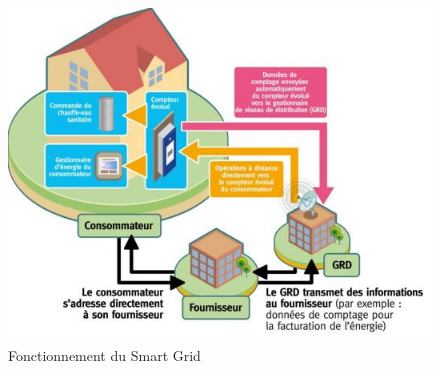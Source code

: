 \begin{figure}[h]
	\centering
    \includegraphics[scale=0.5]{img/part2/1.2}
    \caption{Fonctionnement du Smart Grid}
\end{figure}